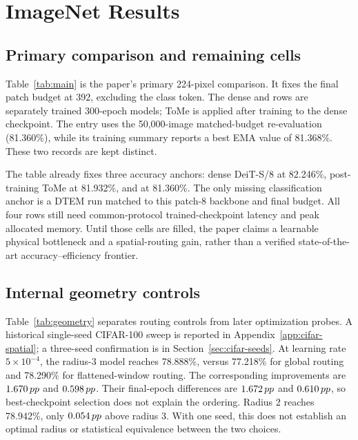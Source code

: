 \section{ImageNet Results}
\label{sec:results}

\subsection{Primary comparison and remaining cells}

Table~\ref{tab:main} is the paper's primary 224-pixel comparison. It fixes
the final patch budget at 392, excluding the class token. The dense and
\mn{} rows are separately trained 300-epoch models; ToMe is applied after
training to the dense checkpoint. The \mn{} entry uses the 50,000-image
matched-budget re-evaluation (81.360\%), while its training summary reports a
best EMA value of 81.368\%. These two records are kept distinct.

\begin{table}[t]
\centering\small
\setlength{\tabcolsep}{5pt}

\caption{Primary ImageNet-1K table at 224 pixels. Patch counts exclude CLS.
All blank cells are required outputs of one collaborator-side P03 run; they
are not zero values or estimates. Accuracy and deployment measurements may
be compared jointly only after the same checkpoint, preprocessing,
precision, batch, attention policy, and timed path have been verified.}
\label{tab:main}
\end{table}

The table already fixes three accuracy anchors: dense DeiT-S/8 at 82.246\%,
post-training ToMe at 81.932\%, and \mn{} at 81.360\%. The only missing
classification anchor is a DTEM run matched to this patch-8 backbone and
final budget. All four rows still need common-protocol trained-checkpoint
latency and peak allocated memory. Until those cells are filled, the paper
claims a learnable physical bottleneck and a spatial-routing gain, rather
than a verified state-of-the-art accuracy--efficiency frontier.

\subsection{Internal geometry controls}

Table~\ref{tab:geometry} separates routing controls from later optimization
probes. A historical single-seed CIFAR-100 sweep is reported in
Appendix~\ref{app:cifar-spatial}; a three-seed confirmation is in
Section~\ref{sec:cifar-seeds}. At learning rate $5\times10^{-4}$, the
radius-3 model reaches 78.888\%, versus 77.218\% for global routing and
78.290\% for flattened-window routing. The corresponding improvements are
$1.670\,pp$ and $0.598\,pp$. Their final-epoch differences are $1.672\,pp$ and
$0.610\,pp$, so best-checkpoint selection does not explain the ordering.
Radius 2 reaches 78.942\%, only $0.054\,pp$ above radius 3. With one seed,
this does not establish an optimal radius or statistical equivalence between
the two choices.

